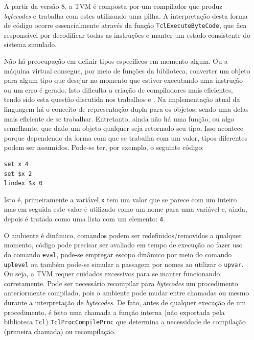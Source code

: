 A partir da versão 8, a TVM é composta por um compilador que produz
\textit{bytecodes} e trabalha com estes utilizando uma pilha. A
interpretação desta forma de código ocorre essencialmente através da
função \verb!TclExecuteByteCode!, que fica responsável por decodificar
todas as instruções e manter um estado consistente do sistema
simulado.


Não há preocupação em definir tipos específicos em momento
algum. Ou a máquina virtual consegue, por meio de funções da
biblioteca, converter um objeto para algum tipo que desejar no momento
que estiver executando uma instrução ou um erro é gerado. Isto
dificulta a criação de compiladores mais eficientes, tendo sido esta
questão discutida nos trabalhos \cite{sah_tc} e
\cite{tcl_bytecode}. Na implementação atual da linguagem há o conceito
de representação dupla para os objetos, sendo uma delas mais eficiente
de se trabalhar. Entretanto, ainda não há uma função, ou algo
semelhante, que dado um objeto qualquer seja retornado seu tipo. Isso
acontece porque dependendo da forma com que se trabalha com um valor,
tipos diferentes podem ser assumidos. Pode-se ter, por exemplo, o
seguinte código:
\begin{verbatim}
set x 4
set $x 2
lindex $x 0
\end{verbatim}
Isto é, primeiramente a variável \verb!x! tem um valor que se parece
com um inteiro mas em seguida este valor é utilizado como um nome para uma
variável e, ainda, depois é tratada como uma lista com um elemento: \verb!4!.

O ambiente é dinâmico, comandos podem ser redefinidos/removidos a qualquer
momento, código pode precisar ser avaliado em tempo de execução ao
fazer uso do comando \verb!eval!, pode-se empregar escopo dinâmico por
meio do comando \verb!uplevel! ou também pode-se simular a passagem
por nomes ao utilizar o \verb!upvar!. Ou seja, a TVM requer cuidados
excessivos para se manter funcionando corretamente. Pode ser
necessário recompilar para \textit{bytecodes} um procedimento
anteriormente compilado, pois o ambiente pode mudar entre chamadas ou
mesmo durante a interpretação de \textit{bytecodes}. De fato, antes de
qualquer execução de um procedimento, é feito uma chamada a função
interna (não exportada pela biblioteca \texttt{Tcl})
\verb!TclProcCompileProc! que determina a necessidade de compilação
(primeira chamada) ou recompilação.

